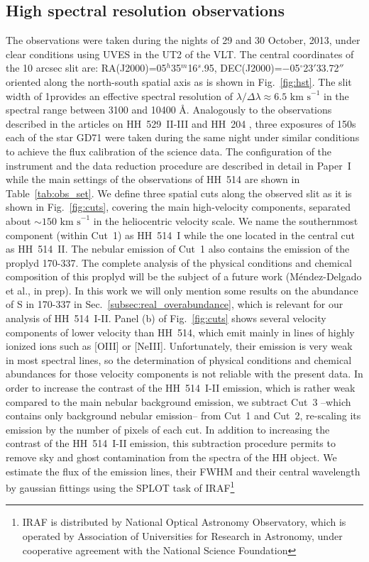 \documentclass[fleqn,usenatbib]{mnras}
\begin{document}
\subsection{High spectral resolution observations}
\label{sec:data_uves}

The observations were taken during the nights of 29 and 30 October, 2013, under clear conditions using UVES in the UT2 of the VLT. The central coordinates of the 10 arcsec slit are: RA(J2000)=05$^h$35$^m$16$^s$.95, DEC(J2000)=$-$05$^{\circ}$23$'$33.72$''$ oriented along the north-south spatial axis as is shown in Fig.~\ref{fig:hst}. The slit width of 1\arcsec provides an effective spectral resolution of $\lambda/\Delta \lambda \approx 6.5 \text{ km s}^{-1}$ in the spectral range between 3100 and 10400 \AA. Analogously to the observations described in the articles on HH~529~II-III and HH~204 \citep[][hereinafter Paper~I and Paper~II, respectively]{mendez2021,mendez2021-2}, three exposures of 150s each of the star GD71 \citep{Moehler14a, Moehler14b} were taken during the same night under similar conditions to achieve the flux calibration of the science data. The configuration of the instrument and the data reduction procedure are described in detail in Paper~I while the main settings of the observations of HH~514 are shown in Table~\ref{tab:obs_set}. We define three spatial cuts along the observed slit as it is shown in Fig.~\ref{fig:cuts}, covering the main high-velocity components, separated about $\sim 150\text{ km s}^{-1}$ in the heliocentric velocity scale. We name the southernmost component (within Cut~1) as HH~514~I while the one located in the central cut as HH~514~II. The nebular emission of Cut~1 also contains the emission of the proplyd 170-337. The complete analysis of the physical conditions and chemical composition of this proplyd will be the subject of a future work (M\'endez-Delgado et al., in prep). In this work we will only mention some results on the abundance of S in 170-337 in Sec.~\ref{subsec:real_overabundance}, which is relevant for our analysis of HH~514~I-II. Panel (b) of Fig.~\ref{fig:cuts} shows several velocity components of lower velocity than HH~514, which emit mainly in lines of highly ionized ions such as [O\thinspace III] or [Ne\thinspace III]. Unfortunately, their emission is very weak in most spectral lines, so the determination of physical conditions and chemical abundances for those velocity components is  not reliable with the present data. In order to increase the contrast of the HH~514~I-II emission, which is rather weak compared to the main nebular background emission, we subtract Cut~3 --which contains only background nebular emission-- from Cut~1 and Cut~2, re-scaling its emission by the number of pixels of each cut. In addition to increasing the contrast of the HH~514~I-II emission, this subtraction procedure permits to remove sky and ghost contamination from the spectra of the HH object. We estimate the flux of the emission lines, their FWHM and their central wavelength by gaussian fittings using the SPLOT task of IRAF\footnote{IRAF is distributed by National Optical Astronomy Observatory, which is operated by Association of Universities for Research in Astronomy, under cooperative agreement with the National Science Foundation} 
\end{document}
